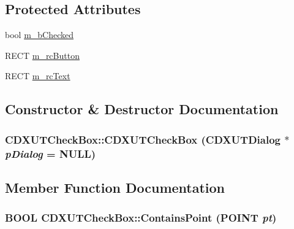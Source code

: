\subsection*{Protected Attributes}
\begin{DoxyCompactItemize}
\item 
bool \hyperlink{class_c_d_x_u_t_check_box_ac2d09bf808d218c90f013d5f0ea5cfa0}{m\_\-bChecked}
\item 
RECT \hyperlink{class_c_d_x_u_t_check_box_a9629eb23cf728bccd8e5850e2e49e74d}{m\_\-rcButton}
\item 
RECT \hyperlink{class_c_d_x_u_t_check_box_af80193c178d600a91d9a8a53b1f852c7}{m\_\-rcText}
\end{DoxyCompactItemize}


\subsection{Constructor \& Destructor Documentation}
\hypertarget{class_c_d_x_u_t_check_box_a68cb9ebbafe610be02ad6b8ca72ca5d7}{
\subsubsection[{CDXUTCheckBox}]{\setlength{\rightskip}{0pt plus 5cm}CDXUTCheckBox::CDXUTCheckBox ({\bf CDXUTDialog} $\ast$ {\em pDialog} = {\ttfamily NULL})}}
\label{class_c_d_x_u_t_check_box_a68cb9ebbafe610be02ad6b8ca72ca5d7}


\subsection{Member Function Documentation}
\hypertarget{class_c_d_x_u_t_check_box_af0a106a73957da96d23dd53c2b9da8e8}{
\subsubsection[{ContainsPoint}]{\setlength{\rightskip}{0pt plus 5cm}BOOL CDXUTCheckBox::ContainsPoint (POINT {\em pt})}}
\label{class_c_d_x_u_t_check_box_af0a106a73957da96d23dd53c2b9da8e8}


